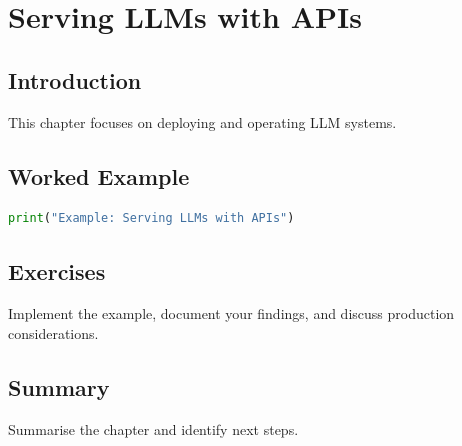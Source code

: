 \chapter{Serving LLMs with APIs}
\label{chap:vol9-16}



\section{Introduction}
This chapter focuses on deploying and operating LLM systems.

\section{Worked Example}
\begin{lstlisting}[language=Python]
print("Example: Serving LLMs with APIs")
\end{lstlisting}

\section{Exercises}
\begin{exercise}
Implement the example, document your findings, and discuss production considerations.
\end{exercise}

\section{Summary}
Summarise the chapter and identify next steps.
